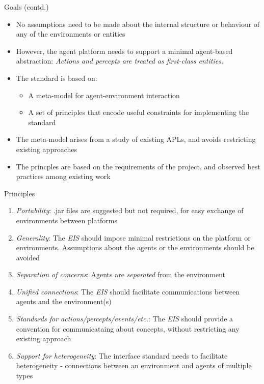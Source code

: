 \documentclass[t]{beamer}
\begin{document}
\begin{frame}{Goals (contd.)}
	\begin{itemize}
		\item No assumptions need to be made about the internal structure or behaviour of any of the environments or entities
		\item However, the agent platform needs to support a minimal agent-based abstraction: \linebreak \textit{Actions and percepts are treated as first-class entities.}
		\item The standard is based on:
		\begin{itemize}
			\item A meta-model for agent-environment interaction
			\item A set of principles that encode useful constraints for implementing the standard
		\end{itemize}
		\item The meta-model arises from a study of existing APLs, and avoids restricting existing approaches
		\item The princples are based on the requirements of the project, and observed best practices among existing work
	\end{itemize}
\end{frame}
\begin{frame}{Principles}
	\begin{enumerate}
		\item \textit{Portability}: .jar files are suggested but not required, for easy exchange of environments between platforms
		\item \textit{Generality}: The \emph{EIS} should impose minimal restrictions on the platform or environments. Assumptions about the agents or the environments should be avoided
		\item \textit{Separation of concerns}: Agents are \textit{separated} from the environment
		\item \textit{Unified connections}: The \emph{EIS} should facilitate communications between agents and the environment(s)
		\item \textit{Standards for actions/percepts/events/etc.}: The \emph{EIS} should provide a convention for communicataing about concepts, without restricting any existing approach
		\item \textit{Support for heterogeneity}: The interface standard needs to facilitate heterogeneity - connections between an environment and agents of multiple types
	\end{enumerate}
\end{frame}
\end{document}

